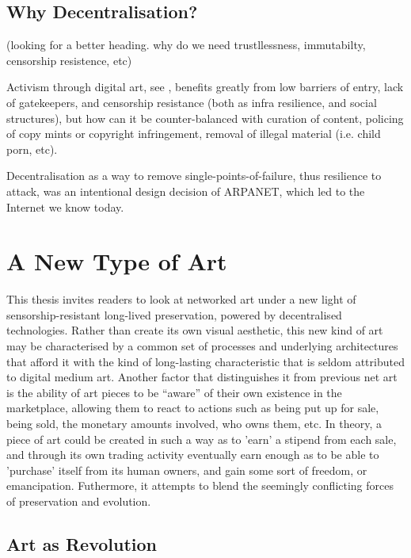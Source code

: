 \subsection{Why Decentralisation?}
(looking for a better heading. why do we need trustllessness, immutabilty, censorship resistence, etc)

Activism through digital art, see \cite[p.~212]{hopeDigitalArtsIntroduction2014} , benefits greatly from low barriers of entry, lack of gatekeepers, and censorship resistance (both as infra resilience, and social structures), but how can it be counter-balanced with curation of content, policing of copy mints or copyright infringement, removal of illegal material (i.e. child porn, etc).

Decentralisation as a way to remove single-points-of-failure, thus resilience to attack, was an intentional design decision of ARPANET, which led to the Internet we know today. \cite[p.10]{paulDigitalArt2015}



\section{A New Type of Art}

This thesis invites readers to look at networked art under a new light of sensorship-resistant long-lived preservation, powered by decentralised technologies. Rather than create its own visual aesthetic, this new kind of art may be characterised by a common set of processes and underlying architectures that afford it with the kind of long-lasting characteristic that is seldom attributed to digital medium art.
Another factor that distinguishes it from previous net art is the ability of art pieces to be ``aware'' of their own existence in the marketplace, allowing them to react to actions such as being put up for sale, being sold, the monetary amounts involved, who owns them, etc.
In theory, a piece of art could be created in such a way as to 'earn' a stipend from each sale, and through its own trading activity eventually earn enough as to be able to 'purchase' itself from its human owners, and gain some sort of freedom, or emancipation.
Futhermore, it attempts to blend the seemingly conflicting forces of preservation and evolution.

\subsection{Art as Revolution}

